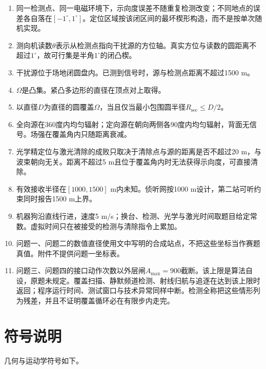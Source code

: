 \documentclass{cumcmthesis}
\begin{document}
\begin{enumerate}
\item 同一检测点、同一电磁环境下，示向度误差不随重复检测改变；不同地点的误差各自落在$[-1^\circ,1^\circ]$。定位区域按该闭区间的最坏楔形构造，而不是按单次随机实现。
\item 测向机读数$\theta$表示从检测点指向干扰源的方位轴。真实方位与读数的圆距离不超过$1^\circ$，故可行集是半角$1^\circ$的闭凸楔。
\item 干扰源位于场地闭圆盘内。已测到信号时，源与检测点距离不超过1500 m。
\item $\Omega$是凸集。紧凸多边形的直径在顶点对上取得。
\item 以直径$D$为直径的圆覆盖$\Omega$，当且仅当最小包围圆半径$R_{\mathrm{sec}}\le D/2$。
\item 全向源在360度内均匀辐射；定向源在朝向两侧各90度内均匀辐射，背面无信号。场强在覆盖角内只随距离衰减。
\item 光学精定位与激光清除的成败只取决于清除点与源的距离是否不超过20 m，与波束朝向无关。距离不超过5 m且位于覆盖角内时无法获得示向度，可直接清除。
\item 有效接收半径在$[1000,1500]$ m内未知。侦听网按1000 m设计，第二站可听约束同时报告1500 m上界。
\item 机器狗沿直线行进，速度5 m/s；换台、检测、光学与激光时间取题目给定常数。虚拟时间只在被接受的检测与清除指令上累加。
\item 问题一、问题二的数值直径使用文中写明的合成站点，不把这些坐标当作赛题真值。附件不提供问题一坐标表。
\item 问题三、问题四的接口动作次数以外层闸$A_{\max}=900$截断。该上限是算法自设，原题未规定。覆盖扫描、静默频道检测、射线归航与追逐在达到该上限时返回；程序运行时间、测试窗口与技术异常同样中断。检测全称把这些情形列为残差，并且不证明覆盖循环必在有限步内走完。
\end{enumerate}

\clearpage
\section{符号说明}

几何与运动学符号如下。
\end{document}
